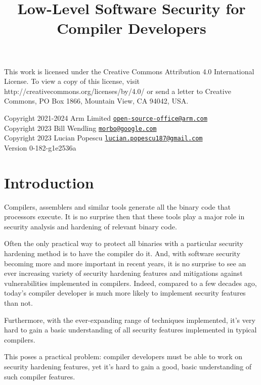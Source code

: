 \documentclass[
  a4paper,
]{report}
\title{Low-Level Software Security for Compiler Developers}
\author{}
\date{}
\begin{document}
\maketitle

\clearpage

\vspace*{\fill}
This work is licensed under the Creative Commons Attribution 4.0 International
License. To view a copy of this license, visit
http://creativecommons.org/licenses/by/4.0/ or send a letter to Creative
Commons, PO Box 1866, Mountain View, CA 94042, USA.

  Copyright 2021-2024 Arm Limited
\href{mailto:open-source-office@arm.com}{\nolinkurl{open-source-office@arm.com}}\\
  Copyright 2023 Bill Wendling
\href{mailto:morbo@google.com}{\nolinkurl{morbo@google.com}}\\
  Copyright 2023 Lucian Popescu
\href{mailto:lucian.popescu187@gmail.com}{\nolinkurl{lucian.popescu187@gmail.com}}\\

Version 0-182-g1e2536a
\clearpage

{
\hypersetup{linkcolor=}
\setcounter{tocdepth}{2}
\tableofcontents
}
\hypertarget{introduction}{%
\chapter{Introduction}\label{introduction}}

Compilers, assemblers and similar tools generate all the binary code
that processors execute. It is no surprise then that these tools play a
major role in security analysis and hardening of relevant binary code.

Often the only practical way to protect all binaries with a particular
security hardening method is to have the compiler do it. And, with
software security becoming more and more important in recent years, it
is no surprise to see an ever increasing variety of security hardening
features and mitigations against vulnerabilities implemented in
compilers. Indeed, compared to a few decades ago, today's compiler
developer is much more likely to implement security features than not.

Furthermore, with the ever-expanding range of techniques implemented,
it's very hard to gain a basic understanding of all security features
implemented in typical compilers.

This poses a practical problem: compiler developers must be able to work
on security hardening features, yet it's hard to gain a good, basic
understanding of such compiler features.
\end{document}
